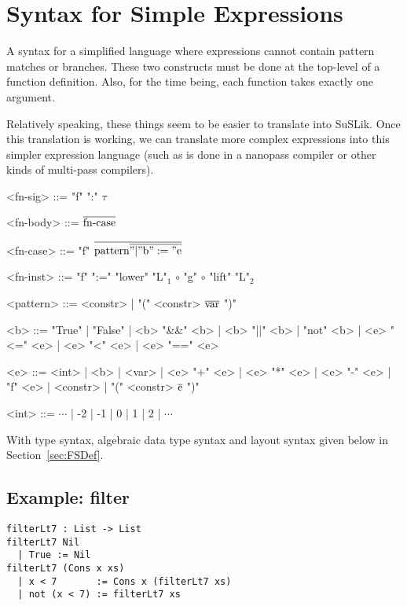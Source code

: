 \documentclass[10pt]{article}
\begin{document}
\section{Syntax for Simple Expressions}

A syntax for a simplified language where expressions cannot contain pattern matches or branches. These
two constructs must be done at the top-level of a function definition. Also, for the time being, each
function takes exactly one argument.

Relatively speaking, these things seem to be easier to translate into SuSLik. Once this translation
is working, we can translate more complex expressions into this simpler expression language (such as
is done in a nanopass compiler or other kinds of multi-pass compilers).

\begin{grammar}
  <fn-sig> ::= "f" ":" $\tau$

  <fn-body> ::= $\overline{\textnormal{fn-case}}$

  <fn-case> ::= "f" $\overline{\textnormal{pattern} \overline{" | " \textnormal{b} " := " \textnormal{e}}}$

  <fn-inst> ::= "f" ":=" "lower" "L"$_1$ $\circ$ "g" $\circ$ "lift" "L"$_2$

  <pattern> ::= <constr> | "(" <constr> $\overline{\textnormal{var}}$ ")"

  <b> ::= "True" | "False" | <b> "&&" <b> | <b> "||" <b> | "not" <b> | <e> "<=" <e> | <e> "<" <e>
    | <e> "==" <e>

  <e> ::= <int> | <b> | <var> | <e> "+" <e> | <e> "*" <e> | <e> "-" <e> | "f" <e> | <constr> | "(" <constr> $\overline{\textnormal{e}}$ ")"

  <int> ::= $\cdots$ | -2 | -1 | 0 | 1 | 2 | $\cdots$
\end{grammar}

\noindent
With type syntax, algebraic data type syntax and layout syntax given below in Section~\ref{sec:FSDef}.

\subsection{Example: filter}

\begin{lstlisting}
filterLt7 : List -> List
filterLt7 Nil
  | True := Nil
filterLt7 (Cons x xs)
  | x < 7       := Cons x (filterLt7 xs)
  | not (x < 7) := filterLt7 xs
\end{lstlisting}
\end{document}
